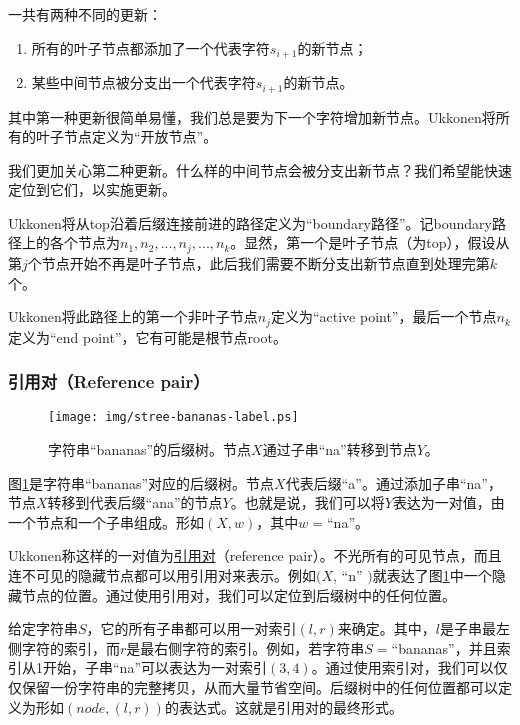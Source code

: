 \documentclass[UTF8]{article}
\begin{document}
一共有两种不同的更新：
\begin{enumerate}
\item 所有的叶子节点都添加了一个代表字符$s_{i+1}$的新节点；
\item 某些中间节点被分支出一个代表字符$s_{i+1}$的新节点。
\end{enumerate}

其中第一种更新很简单易懂，我们总是要为下一个字符增加新节点。Ukkonen将所有的叶子节点定义为“开放节点”。

我们更加关心第二种更新。什么样的中间节点会被分支出新节点？我们希望能快速定位到它们，以实施更新。

Ukkonen将从top沿着后缀连接前进的路径定义为“boundary路径”。记boundary路径上的各个节点为$n_1, n_2, ..., n_j, ..., n_k$。显然，第一个是叶子节点（为top），假设从第$j$个节点开始不再是叶子节点，此后我们需要不断分支出新节点直到处理完第$k$个。

Ukkonen将此路径上的第一个非叶子节点$n_j$定义为“active point”，最后一个节点$n_k$定义为“end point”，它有可能是根节点root。

\subsubsection{引用对（Reference pair）}

\begin{figure}[htbp]
  \centering
  \texttt{[image: img/stree-bananas-label.ps]}
  \caption{字符串“bananas”的后缀树。节点$X$通过子串“na”转移到节点$Y$。}
  \label{fig:stree-bananas-label}
\end{figure}

图\ref{fig:stree-bananas-label}是字符串“bananas”对应的后缀树。节点$X$代表后缀“a”。通过添加子串“na”，节点$X$转移到代表后缀“ana”的节点$Y$。也就是说，我们可以将$Y$表达为一对值，由一个节点和一个子串组成。形如$(X, w)$，其中$w=$“na”。

Ukkonen称这样的一对值为\underline{引用对}（reference pair）。不光所有的可见节点，而且连不可见的隐藏节点都可以用引用对来表示。例如$(X$, “n” $)$就表达了图\ref{fig:stree-bananas-label}中一个隐藏节点的位置。通过使用引用对，我们可以定位到后缀树中的任何位置。

给定字符串$S$，它的所有子串都可以用一对索引$(l, r)$来确定。其中，$l$是子串最左侧字符的索引，而$r$是最右侧字符的索引。例如，若字符串$S=$“bananas”，并且索引从1开始，子串“na”可以表达为一对索引$(3, 4)$。通过使用索引对，我们可以仅仅保留一份字符串的完整拷贝，从而大量节省空间。后缀树中的任何位置都可以定义为形如$(node, (l, r))$的表达式。这就是引用对的最终形式。
\end{document}
